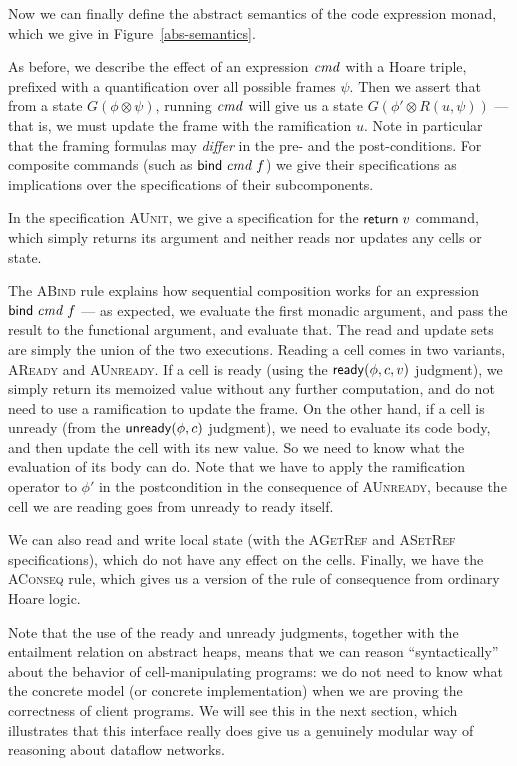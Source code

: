 Now we can finally define the abstract semantics of the code
expression monad, which we give in Figure~\ref{abs-semantics}.

As before, we describe the effect of an expression $\mathit{cmd}$ with a Hoare
triple, prefixed with a quantification over all possible frames
$\psi$. Then we assert that from a state $G(\phi \otimes \psi)$,
running $\mathit{cmd}$ will give us a state $G(\phi' \otimes R(u, \psi))$ ---
that is, we must update the frame with the ramification $u$. Note in
particular that the framing formulas may \emph{differ} in the pre- and
the post-conditions. For composite commands (such as $\mathsf{bind}\; \mathit{cmd}\;f$) we
give their specifications as implications over the specifications of
their subcomponents.

In the specification \textsc{AUnit}, we give a specification for the
$\mathsf{return}\; v$ command, which simply returns its argument and neither
reads nor updates any cells or state. 

The \textsc{ABind} rule explains how sequential composition works for
an expression $\mathsf{bind}\; \mathit{cmd}\;f$ --- as expected, we evaluate the first
monadic argument, and pass the result to the functional argument, and
evaluate that. The read and update sets are simply the union of the
two executions. Reading a cell comes in two variants, \textsc{AReady}
and \textsc{AUnready}. If a cell is ready (using the
$\mathsf{ready}({\phi}, {c}, {v})$ judgment), we simply return its memoized value
without any further computation, and do not need to use a ramification
to update the frame. On the other hand, if a cell is unready (from the
$\mathsf{unready}({\phi}, {c})$ judgment), we need to evaluate its code body, and
then update the cell with its new value. So we need to know what the
evaluation of its body can do. Note that we have to apply the
ramification operator to $\phi'$ in the postcondition in the
consequence of \textsc{AUnready}, because the cell we are reading goes
from unready to ready itself. 

We can also read and write local state (with the \textsc{AGetRef} and
\textsc{ASetRef} specifications), which do not have any effect on the
cells. Finally, we have the \textsc{AConseq} rule, which gives us a
version of the rule of consequence from ordinary Hoare logic.

Note that the use of the ready and unready judgments, together with
the entailment relation on abstract heaps, means that we can reason
``syntactically'' about the behavior of cell-manipulating programs: we
do not need to know what the concrete model (or concrete
implementation) when we are proving the correctness of client
programs. We will see this in the next section, which illustrates that
this interface really does give us a genuinely modular way of
reasoning about dataflow networks.

